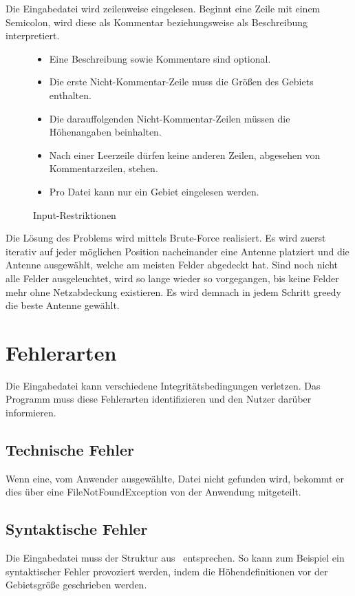 Die Eingabedatei wird zeilenweise eingelesen.
Beginnt eine Zeile mit einem Semicolon, wird diese als Kommentar beziehungsweise als Beschreibung interpretiert.
\begin{figure}[h]
    \centering
    \caption{Input-Restriktionen}
    \begin{itemize}[noitemsep]
        \item Eine Beschreibung sowie Kommentare sind optional.
        \item Die erste Nicht-Kommentar-Zeile muss die Größen des Gebiets enthalten.
        \item Die darauffolgenden Nicht-Kommentar-Zeilen müssen die Höhenangaben beinhalten.
        \item Nach einer Leerzeile dürfen keine anderen Zeilen, abgesehen von Kommentarzeilen, stehen.
        \item Pro Datei kann nur ein Gebiet eingelesen werden.
    \end{itemize}
    \label{fig:input-restrictions}
\end{figure}

Die Lösung des Problems wird mittels Brute-Force realisiert.
Es wird zuerst iterativ auf jeder möglichen Position nacheinander eine Antenne platziert und die Antenne ausgewählt, welche am meisten Felder abgedeckt hat.
Sind noch nicht alle Felder ausgeleuchtet, wird so lange wieder so vorgegangen, bis keine Felder mehr ohne Netzabdeckung existieren.
Es wird demnach in jedem Schritt greedy die beste Antenne gewählt.


\section{Fehlerarten}\label{sec:fehlerarten}
Die Eingabedatei kann verschiedene Integritätsbedingungen verletzen.
Das Programm muss diese Fehlerarten identifizieren und den Nutzer darüber informieren.

\subsection{Technische Fehler}\label{subsec:technische-fehler}
Wenn eine, vom Anwender ausgewählte, Datei nicht gefunden wird, bekommt er dies über eine FileNotFoundException von der Anwendung mitgeteilt.

\subsection{Syntaktische Fehler}\label{subsec:syntaktische-fehler}
Die Eingabedatei muss der Struktur aus~ entsprechen.
So kann zum Beispiel ein syntaktischer Fehler provoziert werden, indem die Höhendefinitionen vor der Gebietsgröße geschrieben werden.

